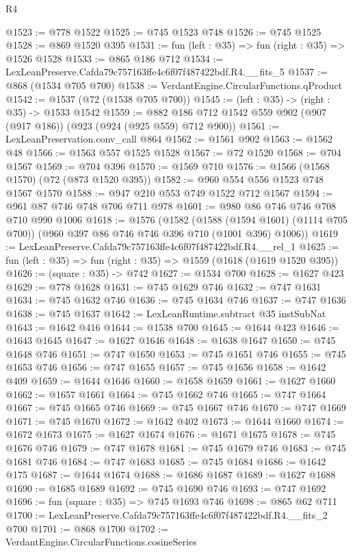 \begin{lexlean}{R4}
\begin{coremodule}
@1523 := @778 @1522
@1525 := @745 @1523 @748
@1526 := @745 @1525
@1528 := @869 @1520 @395
@1531 := fun (left : @35) => fun (right : @35) => @1526 @1528
@1533 := @865 @186 @712
@1534 := LexLeanPreserve.Cafda79c757163ffe4c6f07f487422bdf.R4.__fits_5
@1537 := @868 (@1534 @705 @700)
@1538 := VerdantEngine.CircularFunctions.qProduct
@1542 := @1537 (@72 (@1538 @705 @700))
@1545 := (left : @35) -> (right : @35) -> @1533 @1542
@1559 := @882 @186 @712 @1542 @559 @902 (@907 (@917 @186)) (@923 (@924 (@925 @559) @712 @900))
@1561 := LexLeanPreservation.conv_call @864
@1562 := @1561 @902
@1563 := @1562 @48
@1566 := @1563 @557 @1525 @1528
@1567 := @72 @1520
@1568 := @704 @1567
@1569 := @704 @396
@1570 := @1569 @710
@1576 := @1566 (@1568 @1570) (@72 (@873 @1520 @395))
@1582 := @960 @554 @556 @1523 @748 @1567 @1570
@1588 := @947 @210 @553 @749 @1522 @712 @1567
@1594 := @961 @87 @746 @748 @706 @711 @978
@1601 := @980 @86 @746 @746 @708 @710 @990 @1006
@1618 := @1576
    (@1582
      (@1588 (@1594 @1601) (@1114 @705 @700))
      (@960 @397 @86 @746 @746 @396 @710 (@1001 @396) @1006))
@1619 := LexLeanPreserve.Cafda79c757163ffe4c6f07f487422bdf.R4.__rel_1
@1625 := fun (left : @35) => fun (right : @35) => @1559 (@1618 (@1619 @1520 @395))
@1626 := (square : @35) -> @742
@1627 := @1534 @700
@1628 := @1627 @423
@1629 := @778 @1628
@1631 := @745 @1629 @746
@1632 := @747 @1631
@1634 := @745 @1632 @746
@1636 := @745 @1634 @746
@1637 := @747 @1636
@1638 := @745 @1637
@1642 := LexLeanRuntime.subtract @35 instSubNat
@1643 := @1642 @416
@1644 := @1538 @700
@1645 := @1644 @423
@1646 := @1643 @1645
@1647 := @1627 @1646
@1648 := @1638 @1647
@1650 := @745 @1648 @746
@1651 := @747 @1650
@1653 := @745 @1651 @746
@1655 := @745 @1653 @746
@1656 := @747 @1655
@1657 := @745 @1656
@1658 := @1642 @409
@1659 := @1644 @1646
@1660 := @1658 @1659
@1661 := @1627 @1660
@1662 := @1657 @1661
@1664 := @745 @1662 @746
@1665 := @747 @1664
@1667 := @745 @1665 @746
@1669 := @745 @1667 @746
@1670 := @747 @1669
@1671 := @745 @1670
@1672 := @1642 @402
@1673 := @1644 @1660
@1674 := @1672 @1673
@1675 := @1627 @1674
@1676 := @1671 @1675
@1678 := @745 @1676 @746
@1679 := @747 @1678
@1681 := @745 @1679 @746
@1683 := @745 @1681 @746
@1684 := @747 @1683
@1685 := @745 @1684
@1686 := @1642 @175
@1687 := @1644 @1674
@1688 := @1686 @1687
@1689 := @1627 @1688
@1690 := @1685 @1689
@1692 := @745 @1690 @746
@1693 := @747 @1692
@1696 := fun (square : @35) => @745 @1693 @746
@1698 := @865 @62 @711
@1700 := LexLeanPreserve.Cafda79c757163ffe4c6f07f487422bdf.R4.__fits_2 @700
@1701 := @868 @1700
@1702 := VerdantEngine.CircularFunctions.cosineSeries

\end{coremodule}
\end{lexlean}
